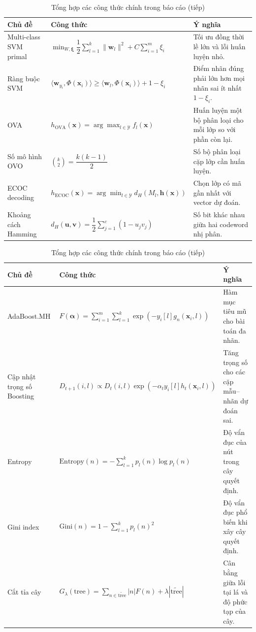 \begin{table}[H]
\centering
\small
\caption{Tổng hợp các công thức chính trong báo cáo (tiếp)}
\begin{tabular}{|>{\raggedright\arraybackslash}p{3.2cm}|>{\raggedright\arraybackslash}p{5.6cm}|>{\raggedright\arraybackslash}p{5.2cm}|}
\hline
\textbf{Chủ đề} & \textbf{Công thức} & \textbf{Ý nghĩa} \\
\hline
Multi-class SVM primal
& $\min_{W,\bm{\xi}}\dfrac{1}{2}\sum_{l=1}^{k}\|\bm{w}_l\|^2+C\sum_{i=1}^{m}\xi_i$
& Tối ưu đồng thời lề lớn và lỗi huấn luyện nhỏ. \\
\hline
Ràng buộc SVM
& $\langle\bm{w}_{y_i},\Phi(\bm{x}_i)\rangle\geq\langle\bm{w}_{l},\Phi(\bm{x}_i)\rangle+1-\xi_i$
& Điểm nhãn đúng phải lớn hơn mọi nhãn sai ít nhất $1-\xi_i$. \\
\hline
OVA
& $h_{\text{OVA}}(\bm{x})=\arg\max_{l\in\mathcal{Y}}f_l(\bm{x})$
& Huấn luyện một bộ phân loại cho mỗi lớp so với phần còn lại. \\
\hline
Số mô hình OVO
& $\binom{k}{2}=\dfrac{k(k-1)}{2}$
& Số bộ phân loại cặp lớp cần huấn luyện. \\
\hline
ECOC decoding
& $h_{\text{ECOC}}(\bm{x})=\arg\min_{l\in\mathcal{Y}}d_H(M_l,\bm{h}(\bm{x}))$
& Chọn lớp có mã gần nhất với vector dự đoán. \\
\hline
Khoảng cách Hamming
& $d_H(\bm{u},\bm{v})=\dfrac{1}{2}\sum_{j=1}^{c}(1-u_jv_j)$
& Số bit khác nhau giữa hai codeword nhị phân. \\
\hline
\end{tabular}
\end{table}

\begin{table}[H]
\centering
\small
\caption{Tổng hợp các công thức chính trong báo cáo (tiếp)}
\begin{tabular}{|>{\raggedright\arraybackslash}p{3.2cm}|>{\raggedright\arraybackslash}p{5.6cm}|>{\raggedright\arraybackslash}p{5.2cm}|}
\hline
\textbf{Chủ đề} & \textbf{Công thức} & \textbf{Ý nghĩa} \\
\hline
AdaBoost.MH
& $F(\bm{\alpha})=\sum_{i=1}^{m}\sum_{l=1}^{k}\exp(-y_i[l]g_n(\bm{x}_i,l))$
& Hàm mục tiêu mũ cho bài toán đa nhãn. \\
\hline
Cập nhật trọng số Boosting
& $D_{t+1}(i,l)\propto D_t(i,l)\exp(-\alpha_t y_i[l]h_t(\bm{x}_i,l))$
& Tăng trọng số cho các cặp mẫu--nhãn dự đoán sai. \\
\hline
Entropy
& $\text{Entropy}(n)=-\sum_{l=1}^{k}p_l(n)\log p_l(n)$
& Độ vẩn đục của nút trong cây quyết định. \\
\hline
Gini index
& $\text{Gini}(n)=1-\sum_{l=1}^{k}p_l(n)^2$
& Độ vẩn đục phổ biến khi xây cây quyết định. \\
\hline
Cắt tỉa cây
& $G_\lambda(\text{tree})=\sum_{n\in\widetilde{\text{tree}}}|n|F(n)+\lambda|\widetilde{\text{tree}}|$
& Cân bằng giữa lỗi tại lá và độ phức tạp của cây. \\
\hline
\end{tabular}
\end{table}